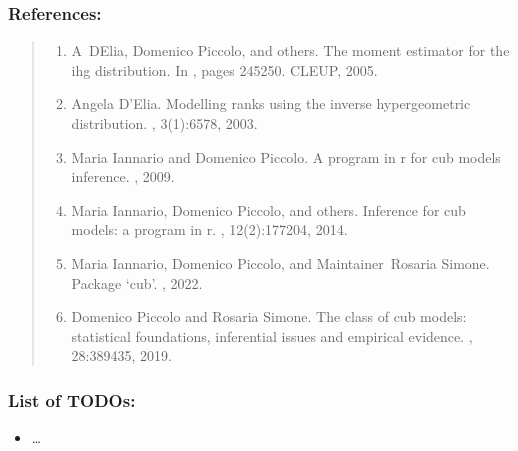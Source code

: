 \documentclass[letterpaper,10pt,english]{sphinxmanual}
\begin{document}
\subsubsection{References:}
\label{\detokenize{cubmods:id801}}\begin{quote}
\begin{enumerate}
%
\setcounter{enumi}{0}
\item {} 
\sphinxAtStartPar
A D\textquotesingle{}Elia, Domenico Piccolo, and others. The moment estimator for the ihg distribution. In , pages 245\textendash{}250. CLEUP, 2005.

\item {} 
\sphinxAtStartPar
Angela D’Elia. Modelling ranks using the inverse hypergeometric distribution. , 3(1):65\textendash{}78, 2003.

\item {} 
\sphinxAtStartPar
Maria Iannario and Domenico Piccolo. A program in r for cub models inference. , 2009.

\item {} 
\sphinxAtStartPar
Maria Iannario, Domenico Piccolo, and others. Inference for cub models: a program in r. , 12(2):177\textendash{}204, 2014.

\item {} 
\sphinxAtStartPar
Maria Iannario, Domenico Piccolo, and Maintainer Rosaria Simone. Package ‘cub’. , 2022.

\item {} 
\sphinxAtStartPar
Domenico Piccolo and Rosaria Simone. The class of cub models: statistical foundations, inferential issues and empirical evidence. , 28:389\textendash{}435, 2019.

\end{enumerate}
\end{quote}


\subsubsection{List of TODOs:}
\label{\detokenize{cubmods:id839}}\begin{itemize}
\item {} 
\sphinxAtStartPar
…

\end{itemize}
\end{document}
